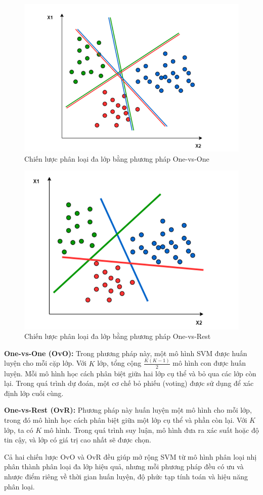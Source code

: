 \begin{figure}[htbp]
    \centering
    \includegraphics[width=0.6\linewidth]{images/svm_ovso.png}
    \caption{Chiến lược phân loại đa lớp bằng phương pháp One-vs-One}
    \label{svm_ovso}
\end{figure}

\begin{figure}[htbp]
    \centering
    \includegraphics[width=0.6\linewidth]{images/ovsr.png}
    \caption{Chiến lược phân loại đa lớp bằng phương pháp One-vs-Rest}
    \label{ovsr}
\end{figure}

\textbf{One-vs-One (OvO):} Trong phương pháp này, một mô hình SVM được 
huấn luyện cho mỗi cặp lớp. Với $K$ lớp, tổng cộng $\frac{K(K-1)}{2}$ 
mô hình con được huấn luyện. Mỗi mô hình học cách phân biệt giữa hai 
lớp cụ thể và bỏ qua các lớp còn lại. Trong quá trình dự đoán, một cơ 
chế bỏ phiếu (voting) được sử dụng để xác định lớp cuối cùng. 


\textbf{One-vs-Rest (OvR):} Phương pháp này huấn luyện một mô hình cho 
mỗi lớp, trong đó mô hình học cách phân biệt giữa một lớp cụ thể và 
phần còn lại. Với $K$ lớp, ta có $K$ mô hình. Trong quá trình suy luận, 
mô hình đưa ra xác suất hoặc độ tin cậy, và lớp có giá trị cao nhất 
sẽ được chọn.

Cả hai chiến lược OvO và OvR đều giúp mở rộng SVM từ mô hình phân loại 
nhị phân thành phân loại đa lớp hiệu quả, nhưng mỗi phương pháp đều có 
ưu và nhược điểm riêng về thời gian huấn luyện, độ phức tạp tính toán 
và hiệu năng phân loại.



